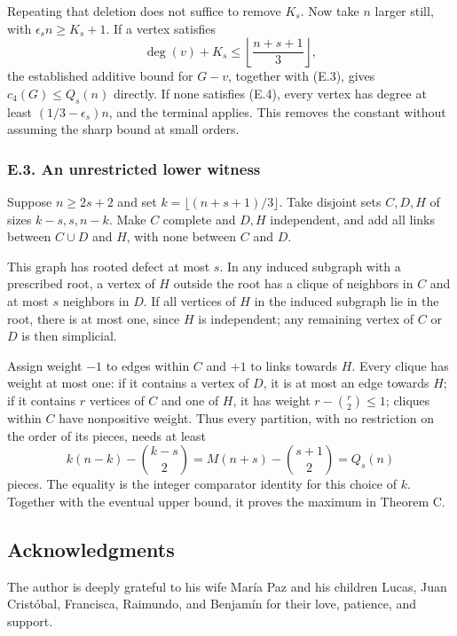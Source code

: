 \documentclass[english,11pt,a4paper]{article}
\newcounter{none}
\begin{document}
Repeating that deletion does not suffice to remove \(K_s\). Now take \(n\) larger still, with \(\epsilon_s n\ge K_s+1\). If a vertex satisfies \[
\deg(v)+K_s\le\left\lfloor\frac{n+s+1}{3}\right\rfloor,
\tag{E.4}
\] the established additive bound for \(G-v\), together with (E.3), gives \(c_4(G)\le Q_s(n)\) directly. If none satisfies (E.4), every vertex has degree at least \((1/3-\epsilon_s)n\), and the terminal applies. This removes the constant without assuming the sharp bound at small orders.

\subsubsection{E.3. An unrestricted lower witness}\label{e.3.-an-unrestricted-lower-witness}

Suppose \(n\ge2s+2\) and set \(k=\lfloor(n+s+1)/3\rfloor\). Take disjoint sets \(C,D,H\) of sizes \(k-s,s,n-k\). Make \(C\) complete and \(D,H\) independent, and add all links between \(C\cup D\) and \(H\), with none between \(C\) and \(D\).

This graph has rooted defect at most \(s\). In any induced subgraph with a prescribed root, a vertex of \(H\) outside the root has a clique of neighbors in \(C\) and at most \(s\) neighbors in \(D\). If all vertices of \(H\) in the induced subgraph lie in the root, there is at most one, since \(H\) is independent; any remaining vertex of \(C\) or \(D\) is then simplicial.

Assign weight \(-1\) to edges within \(C\) and \(+1\) to links towards \(H\). Every clique has weight at most one: if it contains a vertex of \(D\), it is at most an edge towards \(H\); if it contains \(r\) vertices of \(C\) and one of \(H\), it has weight \(r-\binom r2\le1\); cliques within \(C\) have nonpositive weight. Thus every partition, with no restriction on the order of its pieces, needs at least \[
k(n-k)-\binom{k-s}{2}
=M(n+s)-\binom{s+1}{2}=Q_s(n)
\tag{E.5}
\] pieces. The equality is the integer comparator identity for this choice of \(k\). Together with the eventual upper bound, it proves the maximum in Theorem C.

\subsection{Acknowledgments}\label{acknowledgments}

The author is deeply grateful to his wife María Paz and his children Lucas, Juan Cristóbal, Francisca, Raimundo, and Benjamín for their love, patience, and support.
\end{document}
